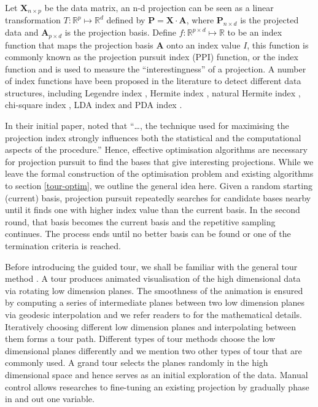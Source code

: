 \documentclass[12pt]{article}
\begin{document}
Let \(\mathbf{X}_{n \times p}\) be the data matrix, an n-d projection
can be seen as a linear transformation
\(T: \mathbb{R}^p \mapsto \mathbb{R}^d\) defined by
\(\mathbf{P} = \mathbf{X} \cdot \mathbf{A}\), where
\(\mathbf{P}_{n \times d}\) is the projected data and
\(\mathbf{A}_{p\times d}\) is the projection basis. Define
\(f: \mathbb{R}^{p \times d} \mapsto \mathbb{R}\) to be an index
function that maps the projection basis \(\mathbf{A}\) onto an index
value \(I\), this function is commonly known as the projection pursuit
index (PPI) function, or the index function and is used to measure the
``interestingness'' of a projection. A number of index functions have
been proposed in the literature to detect different data structures,
including Legendre index \citep{friedman1974projection}, Hermite index
\citep{hall1989polynomial}, natural Hermite index
\citep{cook1993projection}, chi-square index
\citep{posse1995projection}, LDA index \citep{lee2005projection} and PDA
index \citep{lee2010projection}.

In their initial paper, \citet{friedman1974projection} noted that
``\ldots{}, the technique used for maximising the projection index
strongly influences both the statistical and the computational aspects
of the procedure.'' Hence, effective optimisation algorithms are
necessary for projection pursuit to find the bases that give interesting
projections. While we leave the formal construction of the optimisation
problem and existing algorithms to section \ref{tour-optim}, we outline
the general idea here. Given a random starting (current) basis,
projection pursuit repeatedly searches for candidate bases nearby until
it finds one with higher index value than the current basis. In the
second round, that basis becomes the current basis and the repetitive
sampling continues. The process ends until no better basis can be found
or one of the termination criteria is reached.

Before introducing the guided tour, we shall be familiar with the
general tour method \citep{cook2008grand}. A tour produces animated
visualisation of the high dimensional data via rotating low dimension
planes. The smoothness of the animation is ensured by computing a series
of intermediate planes between two low dimension planes via geodesic
interpolation and we refer readers to \citet{buja2005computational} for
the mathematical details. Iteratively choosing different low dimension
planes and interpolating between them forms a tour path. Different types
of tour methods choose the low dimensional planes differently and we
mention two other types of tour that are commonly used. A grand tour
selects the planes randomly in the high dimensional space and hence
serves as an initial exploration of the data. Manual control allows
researches to fine-tuning an existing projection by gradually phase in
and out one variable.
\end{document}
